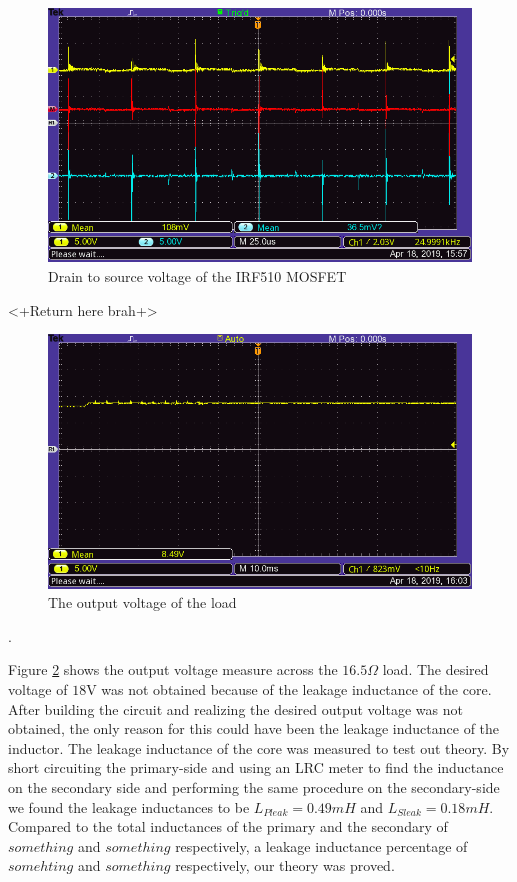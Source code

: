 \documentclass[a4paper, 12pt]{article}
\begin{document}
\begin{figure}[H]
  \centering
  \includegraphics[width=\textwidth]{images/VDS.png}
  \caption{Drain to source voltage of the IRF510 MOSFET}
  \label{fig:vds}
\end{figure} 

<+Return here brah+>

\begin{figure}[H]
  \centering
  \includegraphics[width=\textwidth]{images/output_from_load.png}
  \caption{The output voltage of the load}
  \label{fig:output_from_load}
\end{figure}.

Figure \ref{fig:output_from_load} shows the output voltage measure across the $16.5\Omega$ load. The desired voltage of $18$V was not obtained because of the leakage inductance of the core. After building the circuit and realizing the desired output voltage was not obtained, the only reason for this could have been the leakage inductance of the inductor. The leakage inductance of the core was measured to test out theory. By short circuiting the primary-side and using an LRC meter to find the inductance on the secondary side and performing the same procedure on the secondary-side we found the leakage inductances to be $L_{Pleak} = 0.49mH$ and $L_{Sleak} = 0.18mH$. Compared to the total inductances of the primary and the secondary of $something$ and $something$ respectively, a leakage inductance percentage of $somehting$ and $something$ respectively, our theory was proved.\\
\end{document}
